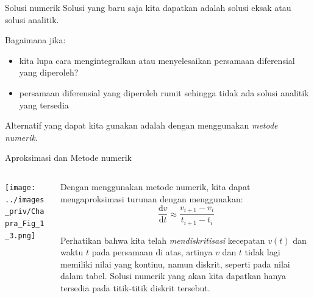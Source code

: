 \begin{frame}{Solusi numerik}
Solusi yang baru saja kita dapatkan adalah solusi eksak atau solusi
analitik.

Bagaimana jika:

\begin{itemize}\tightlist
\item kita lupa cara mengintegralkan atau menyelesaikan persamaan
  diferensial yang diperoleh?
\item persamaan diferensial yang diperoleh rumit sehingga tidak ada
  solusi analitik yang tersedia
\end{itemize}

Alternatif yang dapat kita gunakan adalah dengan menggunakan
\emph{metode numerik}.
\end{frame}



\begin{frame}{Aproksimasi dan Metode numerik}

\begin{columns}[T]
\begin{column}{0.5\textwidth}
{\centering
\texttt{[image: ../images\_priv/Chapra\_Fig\_1\_3.png]}
\par}
\end{column}

\begin{column}{0.5\textwidth}
Dengan menggunakan metode numerik, kita dapat mengaproksimasi turunan
dengan menggunakan:
\begin{equation*}
\frac{\mathrm{d}v}{\mathrm{d}t} \approx \frac{v_{i+1} - v_{i}}{t_{i+1} - t_{i}}
\end{equation*}

Perhatikan bahwa kita telah \emph{mendiskritisasi} kecepatan \(v(t)\)
dan waktu \(t\) pada persamaan di atas, artinya \(v\) dan \(t\) tidak
lagi memiliki nilai yang kontinu, namun diskrit, seperti pada nilai
dalam tabel. Solusi numerik yang akan kita dapatkan hanya tersedia pada
titik-titik diskrit tersebut.
\end{column}
\end{columns}
\end{frame}




